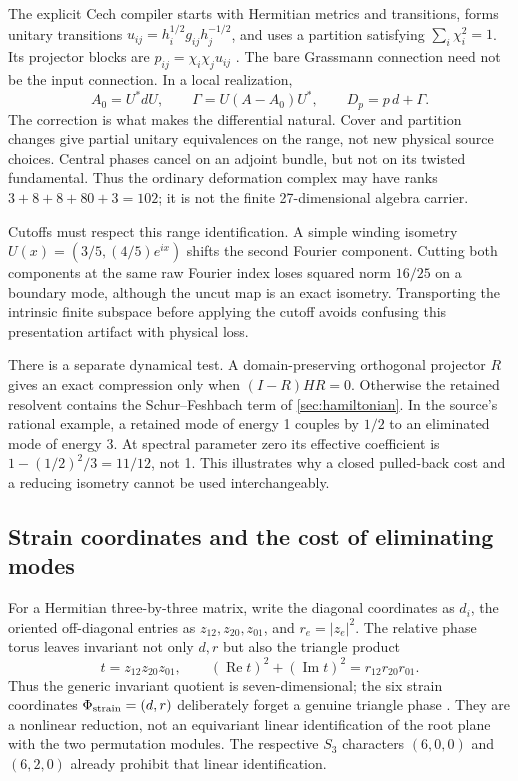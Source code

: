 \documentclass[11pt]{article}
\theoremstyle{definition}
\theoremstyle{remark}
\begin{document}
The explicit Cech compiler starts with Hermitian metrics and transitions,
forms unitary transitions \(u_{ij}=h_i^{1/2}g_{ij}h_j^{-1/2}\), and uses a
partition satisfying \(\sum_i\chi_i^2=1\). Its projector blocks are
\(p_{ij}=\chi_i\chi_j u_{ij}\) \cite{FrozenCech}. The bare Grassmann
connection need not be the input connection. In a local realization,
\[
A_0=U^*dU,\qquad \Gamma=U(A-A_0)U^*,\qquad D_p=p\,d+\Gamma.
\]
The correction is what makes the differential natural. Cover and partition
changes give partial unitary equivalences on the range, not new physical
source choices. Central phases cancel on an adjoint bundle, but not on its
twisted fundamental. Thus the ordinary deformation complex may have ranks
\(3+8+8+80+3=102\); it is not the finite 27-dimensional algebra carrier.
\label{sec:cech-compiler}

Cutoffs must respect this range identification. A simple winding isometry
\(U(x)=(3/5,(4/5)e^{ix})\) shifts the second Fourier component. Cutting both
components at the same raw Fourier index loses squared norm \(16/25\) on a
boundary mode, although the uncut map is an exact isometry. Transporting the
intrinsic finite subspace before applying the cutoff avoids confusing this
presentation artifact with physical loss.

There is a separate dynamical test. A domain-preserving orthogonal projector
\(R\) gives an exact compression only when \((I-R)HR=0\). Otherwise the
retained resolvent contains the Schur--Feshbach term of
\cref{sec:hamiltonian}. In the source's rational example, a retained mode of
energy 1 couples by \(1/2\) to an eliminated mode of energy 3. At spectral
parameter zero its effective coefficient is \(1-(1/2)^2/3=11/12\), not 1.
This illustrates why a closed pulled-back cost and a reducing isometry
cannot be used interchangeably.

\subsection{Strain coordinates and the cost of eliminating modes}
\label{sec:spectral-strain}
For a Hermitian three-by-three matrix, write the diagonal coordinates as
\(d_i\), the oriented off-diagonal entries as \(z_{12},z_{20},z_{01}\), and
\(r_e=|z_e|^2\). The relative phase torus leaves invariant not only \(d,r\)
but also the triangle product
\[
t=z_{12}z_{20}z_{01},\qquad
(\operatorname{Re}t)^2+(\operatorname{Im}t)^2=r_{12}r_{20}r_{01}.
\]
Thus the generic invariant quotient is seven-dimensional; the six strain
coordinates \(\Phi_{\rm strain}=(d,r)\) deliberately forget a genuine
triangle phase \cite{FrozenStrain}. They are a nonlinear reduction, not an
equivariant linear identification of the root plane with the two permutation
modules. The respective \(S_3\) characters \((6,0,0)\) and \((6,2,0)\)
already prohibit that linear identification.
\end{document}
